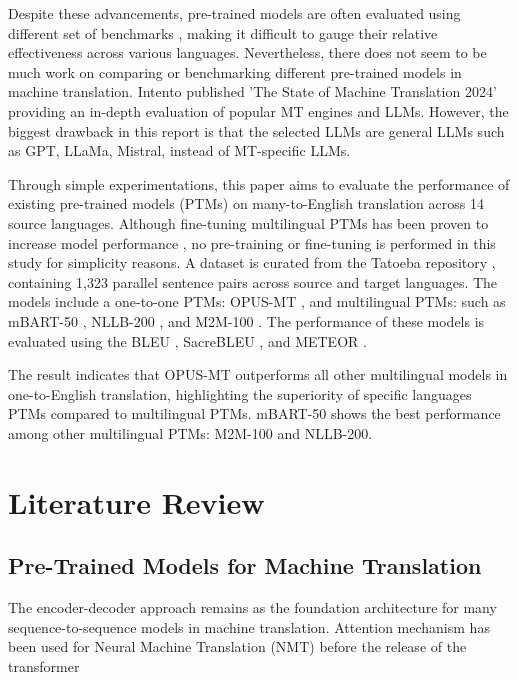 \documentclass[a4paper]{article}
\begin{document}
Despite these advancements, pre-trained models are often evaluated using different set of benchmarks \cite{liu-2020-mbart,nllb200-2020,fan-2020-m2m100,wei-2023-polylm}, making it difficult to gauge their relative effectiveness across various languages. Nevertheless, there does not seem to be much work on comparing or benchmarking different pre-trained models in machine translation. Intento published 'The State of Machine Translation 2024' \cite{intento-2020} providing an in-depth evaluation of popular MT engines and LLMs. However, the biggest drawback in this report is that the selected LLMs are general LLMs such as GPT, LLaMa, Mistral, instead of MT-specific LLMs.

Through simple experimentations, this paper aims to evaluate the performance of existing pre-trained models (PTMs) on many-to-English translation across 14 source languages. Although fine-tuning multilingual PTMs has been proven to increase model performance \cite{cooper-stickland-2021-recipes}, no pre-training or fine-tuning is performed in this study for simplicity reasons. A dataset is curated from the Tatoeba repository \cite{tatoeba}, containing 1,323 parallel sentence pairs across source and target languages. The models include a one-to-one PTMs: OPUS-MT \cite{tiedemann-2023-democratizing,tiedemann-2020-opus-mt}, and multilingual PTMs: such as mBART-50 \cite{liu-2020-mbart}, NLLB-200 \cite{nllb200-2020}, and M2M-100 \cite{fan-2020-m2m100}. The performance of these models is evaluated using the BLEU \cite{papieni-2002-bleu}, SacreBLEU \cite{post-2018-sacrebleu}, and METEOR \cite{lavie-2007-meteor}.

The result indicates that OPUS-MT outperforms all other multilingual models in one-to-English translation, highlighting the superiority of specific languages PTMs compared to multilingual PTMs. mBART-50 shows the best performance among other multilingual PTMs: M2M-100 and NLLB-200.

\section{Literature Review}

\subsection{Pre-Trained Models for Machine Translation}

The encoder-decoder approach \cite{cho-2014-properties} remains as the foundation architecture for many sequence-to-sequence models in machine translation. Attention mechanism has been used for Neural Machine Translation (NMT) \cite{bahdanau-2016-nmt-jointly, luong-2015-effective-attention} before the release of the transformer \cite{vaswani-2017-attention}
\end{document}
